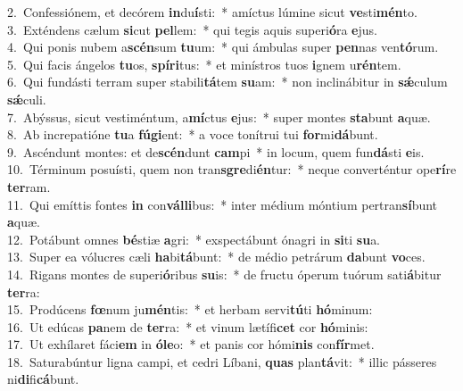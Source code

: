{2.~}Confessiónem, et decórem \textbf{in}du\textbf{í}sti:~* amíctus lúmine sicut \textbf{ve}sti\textbf{mén}to.\\
{3.~}Exténdens cælum \textbf{si}cut \textbf{pel}lem:~* qui tegis aquis superi\textbf{ó}ra \textbf{e}jus.\\
{4.~}Qui ponis nubem a\textbf{scén}sum \textbf{tu}um:~* qui ámbulas super \textbf{pen}nas ven\textbf{tó}rum.\\
{5.~}Qui facis ángelos \textbf{tu}os, \textbf{spí}\textbf{ri}tus:~* et minístros tuos \textbf{i}gnem u\textbf{rén}tem.\\
{6.~}Qui fundásti terram super stabili\textbf{tá}tem \textbf{su}am:~* non inclinábitur in \textbf{sǽ}culum \textbf{sǽ}culi.\\
{7.~}Abýssus, sicut vestiméntum, a\textbf{mí}ctus \textbf{e}jus:~* super montes \textbf{sta}bunt \textbf{a}quæ.\\
{8.~}Ab increpatióne \textbf{tu}a \textbf{fú}\textbf{gi}ent:~* a voce tonítrui tui \textbf{for}mi\textbf{dá}bunt.\\
{9.~}Ascéndunt montes: et de\textbf{scén}dunt \textbf{cam}pi~* in locum, quem fun\textbf{dá}sti \textbf{e}is.\\
{10.~}Términum posuísti, quem non tran\textbf{sgre}di\textbf{én}tur:~* neque converténtur ope\textbf{rí}re \textbf{ter}ram.\\
{11.~}Qui emíttis fontes \textbf{in} con\textbf{vál}\textbf{li}bus:~* inter médium móntium pertran\textbf{sí}bunt \textbf{a}quæ.\\
{12.~}Potábunt omnes \textbf{bé}stiæ \textbf{a}gri:~* exspectábunt ónagri in \textbf{si}ti \textbf{su}a.\\
{13.~}Super ea vólucres cæli \textbf{ha}bi\textbf{tá}bunt:~* de médio petrárum \textbf{da}bunt \textbf{vo}ces.\\
{14.~}Rigans montes de superi\textbf{ó}ribus \textbf{su}is:~* de fructu óperum tuórum sati\textbf{á}bitur \textbf{ter}ra:\\
{15.~}Prodúcens \textbf{fœ}num ju\textbf{mén}tis:~* et herbam servi\textbf{tú}ti \textbf{hó}minum:\\
{16.~}Ut edúcas \textbf{pa}nem de \textbf{ter}ra:~* et vinum lætífi\textbf{cet} cor \textbf{hó}minis:\\
{17.~}Ut exhílaret fáci\textbf{em} in \textbf{ó}\textbf{le}o:~* et panis cor hómi\textbf{nis} con\textbf{fír}met.\\
{18.~}Saturabúntur ligna campi, et cedri Líbani, \textbf{quas} plan\textbf{tá}vit:~* illic pásseres ni\textbf{di}fi\textbf{cá}bunt.\\
